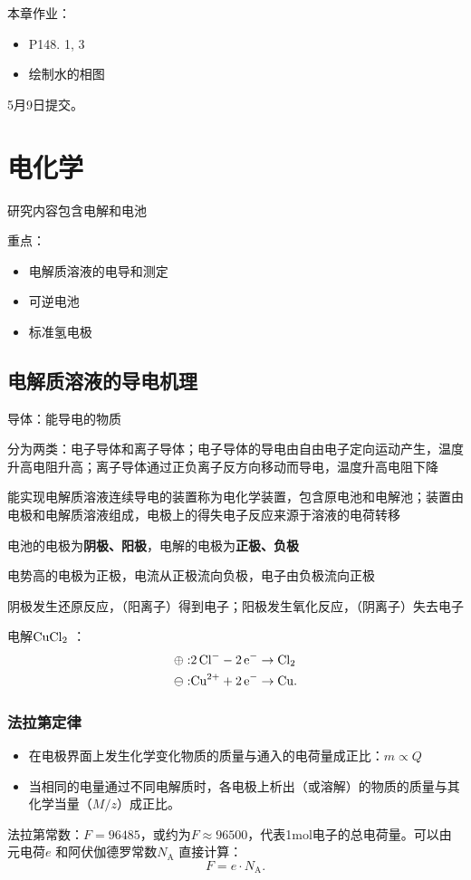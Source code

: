 本章作业：
\begin{itemize}
    \item P148. 1, 3
    \item 绘制水的相图
\end{itemize}
5月9日提交。
\section{电化学}%
\label{sec:电化学}
研究内容包含电解和电池
\begin{notation}
    重点：
    \begin{itemize}
        \item 电解质溶液的电导和测定
        \item 可逆电池
        \item 标准氢电极
    \end{itemize}
\end{notation}
\subsection{电解质溶液的导电机理}%
\label{sub:电解质溶液的导电机理}
\begin{defi}
    导体：能导电的物质
\end{defi}
分为两类：电子导体和离子导体；电子导体的导电由自由电子定向运动产生，温度升高电阻升高；离子导体通过正负离子反方向移动而导电，温度升高电阻下降
\begin{notation}
    能实现电解质溶液连续导电的装置称为电化学装置，包含原电池和电解池；装置由电极和电解质溶液组成，电极上的得失电子反应来源于溶液的电荷转移
\end{notation}
电池的电极为\textbf{阴极、阳极}，电解的电极为\textbf{正极、负极}
\begin{notation}
    电势高的电极为正极，电流从正极流向负极，电子由负极流向正极

    阴极发生还原反应，（阳离子）得到电子；阳极发生氧化反应，（阴离子）失去电子
\end{notation}
\begin{eg}
    电解$\ce{CuCl_2}$ ：
    \begin{align*}
        \oplus:& \ce{2Cl-}-\ce{2e-} \to \ce{Cl_2}\\
        \ominus:& \ce{Cu^2+}+\ce{2e-} \to \ce{Cu}
    .\end{align*}
\end{eg}
\subsubsection{法拉第定律}%
\label{ssub:法拉第定律}
\begin{itemize}
    \item 在电极界面上发生化学变化物质的质量与通入的电荷量成正比：$m\propto Q$ 
    \item 当相同的电量通过不同电解质时，各电极上析出（或溶解）的物质的质量与其化学当量（$M/z$）成正比。
\end{itemize}
法拉第常数：$F=96485$，或约为$F\approx 96500$，代表1mol电子的总电荷量。可以由元电荷$e$ 和阿伏伽德罗常数$N_\text{A}$ 直接计算：
\[
    F = e\cdot N_\text{A}
.\]

